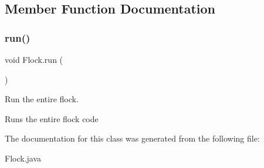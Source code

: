 \subsection{Member Function Documentation}
\mbox{\label{class_flock_ab97db256aa850e22758daba7874ec611}} 
\subsubsection{\texorpdfstring{run()}{run()}}
{\footnotesize\ttfamily void Flock.\+run (\begin{DoxyParamCaption}{ }\end{DoxyParamCaption})\hspace{0.3cm}{\ttfamily [inline]}}



Run the entire flock. 

Runs the entire flock code 

The documentation for this class was generated from the following file\+:\begin{DoxyCompactItemize}
\item 
Flock.\+java\end{DoxyCompactItemize}
